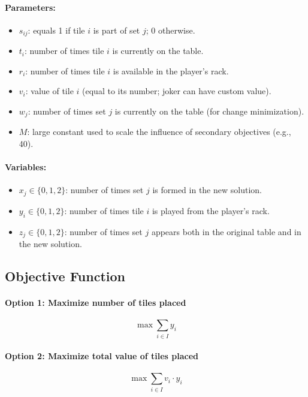 \documentclass[12pt]{article}
\begin{document}
\paragraph{Parameters:}
\begin{itemize}
    \item $s_{ij}$: equals 1 if tile $i$ is part of set $j$; 0 otherwise.
    \item $t_i$: number of times tile $i$ is currently on the table.
    \item $r_i$: number of times tile $i$ is available in the player’s rack.
    \item $v_i$: value of tile $i$ (equal to its number; joker can have custom value).
    \item $w_j$: number of times set $j$ is currently on the table (for change minimization).
    \item $M$: large constant used to scale the influence of secondary objectives (e.g., 40).
\end{itemize}

\paragraph{Variables:}
\begin{itemize}
    \item $x_j \in \{0, 1, 2\}$: number of times set $j$ is formed in the new solution.
    \item $y_i \in \{0, 1, 2\}$: number of times tile $i$ is played from the player’s rack.
    \item $z_j \in \{0, 1, 2\}$: number of times set $j$ appears both in the original table and in the new solution.
\end{itemize}

\subsection{Objective Function}

\paragraph{Option 1: Maximize number of tiles placed}
\[
\max \sum_{i \in I} y_i
\]

\paragraph{Option 2: Maximize total value of tiles placed}
\[
\max \sum_{i \in I} v_i \cdot y_i
\]
\end{document}
